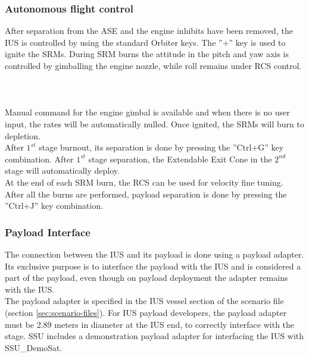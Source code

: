 \documentclass[Space_Shuttle_Ultra_Manual.tex]{subfiles}
\begin{document}
\begin{multicols*}{2}
\subsubsection{Autonomous flight control}
After separation from the ASE and the engine inhibits have been removed, the IUS is controlled by using the standard Orbiter keys. The ''+'' key is used to ignite the SRMs. During SRM burns the attitude in the pitch and yaw axis is controlled by gimballing the engine nozzle, while roll remains under RCS control.
\\
\\
\\
\\
Manual command for the engine gimbal is available and when there is no user input, the rates will be automatically nulled. Once ignited, the SRMs will burn to depletion.\\
After $1^{st}$ stage burnout, its separation is done by pressing the ''Ctrl+G'' key combination. After $1^{st}$ stage separation, the Extendable Exit Cone in the $2^{nd}$ stage will automatically deploy.\\
At the end of each SRM burn, the RCS can be used for velocity fine tuning.\\
After all the burns are performed, payload separation is done by pressing the ''Ctrl+J'' key combination.

\subsubsection{Payload Interface}
The connection between the IUS and its payload is done using a payload adapter. Its exclusive purpose is to interface the payload with the IUS and is considered a part of the payload, even though on payload deployment the adapter remains with the IUS.\\
The payload adapter is specified in the IUS vessel section of the scenario file (section \ref{sec:scenario-files}).
For IUS payload developers, the payload adapter must be 2.89 meters in diameter at the IUS end, to correctly interface with the stage. SSU includes a demonstration payload adapter for interfacing the IUS with SSU\_DemoSat.

\end{multicols*}
\end{document}
